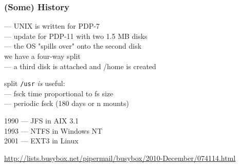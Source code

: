 \documentclass[]{beamer}
\begin{document}
\begin{frame}
  \frametitle{(Some) History}

   — \textsc{\small UNIX} is written for PDP-7\\
   — update for PDP-11 with two 1.5 MB disks\\
  \pause
  \phantom{1670} — the OS "spills over" onto the second disk\\
  \phantom{1670 —} we have a four-way split\\
  \pause
  \phantom{1670} — a third disk is attached and /home is created\\
  \pause

  split \texttt{/usr} \textit{is} useful:\\
  \pause
  \phantom{1670} — fsck time proportional to fs size\\
  \phantom{1670} — periodic fsck (180 days or n mounts)\\
  \pause

  1990 — JFS in AIX 3.1\\
  1993 — NTFS in Windows NT\\
  2001 — EXT3 in Linux

  \vfill

  \tiny
  \url{http://lists.busybox.net/pipermail/busybox/2010-December/074114.html}\vspace{-5em}
\end{frame}
\end{document}
